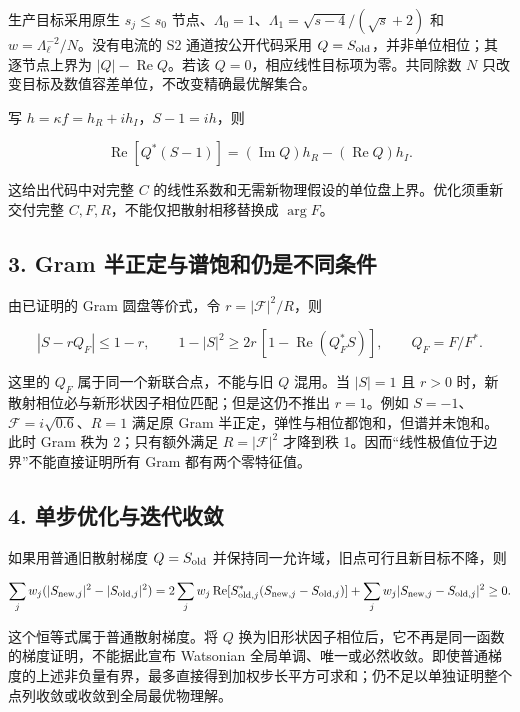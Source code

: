 \documentclass[
  10pt,
  a4paper,
]{article}
\begin{document}
生产目标采用原生 \(s_j\le s_0\)
节点、\(\Lambda_0=1\)、\(\Lambda_1=\sqrt{s-4}/(\sqrt{s}+2)\) 和
\(w=\Lambda_\ell^{-2}/N\)。没有电流的 S2 通道按公开代码采用
\(Q=S_{\rm old}\)，并非单位相位；其逐节点上界为
\(|Q|-\operatorname{Re}Q\)。若该 \(Q=0\)，相应线性目标项为零。共同除数
\(N\) 只改变目标及数值容差单位，不改变精确最优解集合。

写 \(h=\kappa f=h_R+ih_I\)，\(S-1=ih\)，则

\[
\operatorname{Re}[Q^*(S-1)]=(\operatorname{Im}Q)h_R-(\operatorname{Re}Q)h_I.
\]

这给出代码中对完整 \(C\)
的线性系数和无需新物理假设的单位盘上界。优化须重新交付完整
\(C,F,R\)，不能仅把散射相移替换成 \(\arg F\)。

\subsection{3. Gram
半正定与谱饱和仍是不同条件}\label{gram-ux534aux6b63ux5b9aux4e0eux8c31ux9971ux548cux4ecdux662fux4e0dux540cux6761ux4ef6}

由已证明的 Gram 圆盘等价式，令 \(r=|\mathcal F|^2/R\)，则

\[
|S-rQ_F|\le1-r,
\qquad
1-|S|^2\ge2r\,[1-\operatorname{Re}(Q_F^*S)],
\qquad Q_F=F/F^*.
\]

这里的 \(Q_F\) 属于同一个新联合点，不能与旧 \(Q\) 混用。当 \(|S|=1\) 且
\(r>0\) 时，新散射相位必与新形状因子相位匹配；但是这仍不推出
\(r=1\)。例如 \(S=-1\)、\(\mathcal F=i\sqrt{0.6}\)、\(R=1\) 满足原 Gram
半正定，弹性与相位都饱和，但谱并未饱和。此时 Gram 秩为 2；只有额外满足
\(R=|\mathcal F|^2\) 才降到秩
1。因而``线性极值位于边界''不能直接证明所有 Gram 都有两个零特征值。

\subsection{4.
单步优化与迭代收敛}\label{ux5355ux6b65ux4f18ux5316ux4e0eux8fedux4ee3ux6536ux655b}

如果用普通旧散射梯度 \(Q=S_{\rm old}\)
并保持同一允许域，旧点可行且新目标不降，则

\[
\sum_j w_j(|S_{{\rm new},j}|^2-|S_{{\rm old},j}|^2)
=2\sum_jw_j\operatorname{Re}[S_{{\rm old},j}^*(S_{{\rm new},j}-S_{{\rm old},j})]
 +\sum_jw_j|S_{{\rm new},j}-S_{{\rm old},j}|^2\ge0.
\]

这个恒等式属于普通散射梯度。将 \(Q\)
换为旧形状因子相位后，它不再是同一函数的梯度证明，不能据此宣布 Watsonian
全局单调、唯一或必然收敛。即使普通梯度的上述非负量有界，最多直接得到加权步长平方可求和；仍不足以单独证明整个点列收敛或收敛到全局最优物理解。
\end{document}
